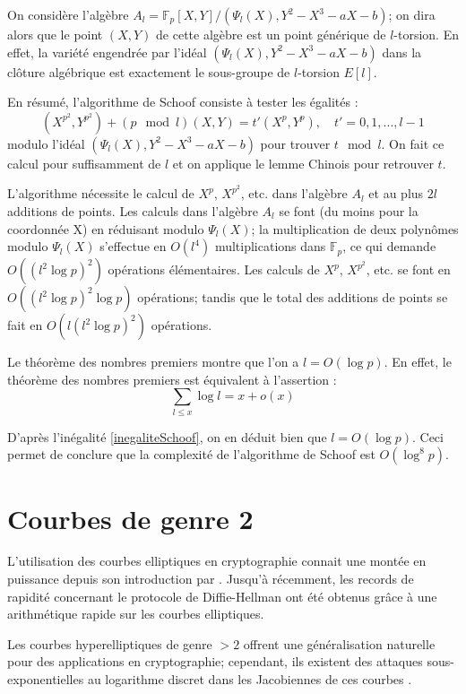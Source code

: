 \documentclass[a4paper]{article}
\theoremstyle{definition}
\theoremstyle{remark}
\numberwithin{equation}{section}
\begin{document}
On considère l'algèbre $A_l=\mathbb{F}_p[X,Y]/(\Psi_l(X),Y^2-X^3-aX-b)$; on dira alors que le point $(X,Y)$ de cette algèbre est un point générique de $l$-torsion. En effet, la variété engendrée par l'idéal $(\Psi_l(X),Y^2-X^3-aX-b)$ dans la clôture algébrique est exactement le sous-groupe de $l$-torsion $E[l]$.

En résumé, l'algorithme de Schoof consiste à tester les égalités :
\begin{equation}
\label{polCarFrob}
(X^{p^2},Y^{p^2}) + (p \mod l)(X,Y) = t'(X^p,Y^p), \quad t' = 0,1,...,l-1
\end{equation}
modulo l'idéal $(\Psi_l(X),Y^2-X^3-aX-b)$ pour trouver $t \mod l$. On fait ce calcul pour suffisamment de $l$ et on applique le lemme Chinois pour retrouver $t$.

L'algorithme nécessite le calcul de $X^p$, $X^{p^2}$, etc. dans l'algèbre $A_l$ et au plus $2l$ additions de points. Les calculs dans l'algèbre $A_l$ se font (du moins pour la coordonnée X) en réduisant modulo $\Psi_l(X)$; la multiplication de deux polynômes modulo $\Psi_l(X)$ s'effectue en $O(l^4)$ multiplications dans $\mathbb{F}_p$, ce qui demande $O((l^2\log p)^2)$ opérations élémentaires. Les calculs de $X^p$, $X^{p^2}$, etc. se font en $O((l^2\log p)^2\log p)$ opérations; tandis que le total des additions de points se fait en $O(l(l^2\log p)^2)$ opérations.

Le théorème des nombres premiers montre que l'on a $l = O(\log p)$. En effet, le théorème des nombres premiers est équivalent à l'assertion :
$$\sum_{l \leq x}\log l = x + o(x)$$

D'après l'inégalité \ref{inegaliteSchoof}, on en déduit bien que $l = O(\log p)$. Ceci permet de conclure que la complexité de l'algorithme de Schoof est $O(\log^8 p)$.

\section{Courbes de genre 2}

L'utilisation des courbes elliptiques en cryptographie connait une montée en puissance depuis son introduction par \citet{koblitz1}. Jusqu'à récemment, les records de rapidité concernant le protocole de Diffie-Hellman ont été obtenus grâce à une arithmétique rapide sur les courbes elliptiques.

Les courbes hyperelliptiques de genre $> 2$ offrent une généralisation naturelle pour des applications en cryptographie; cependant, ils existent des attaques sous-exponentielles au logarithme discret dans les Jacobiennes de ces courbes \citep{gaudry2}.
\end{document}
